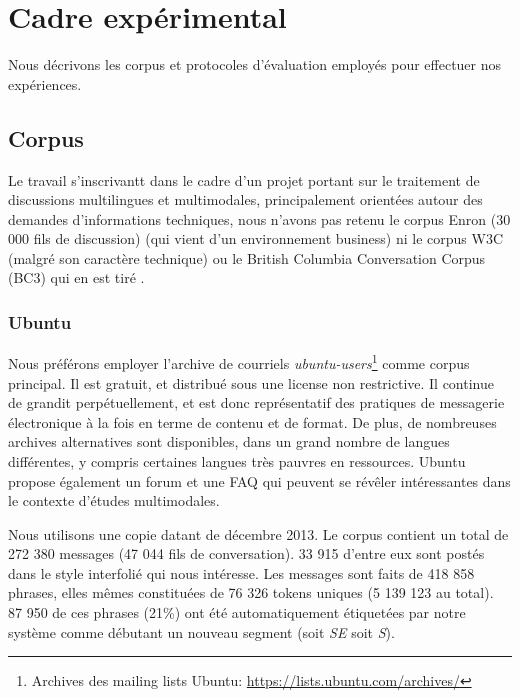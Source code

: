
\chapter{Cadre expérimental}

\label{ch:experimental_framework}

Nous décrivons les corpus et protocoles d'évaluation employés pour effectuer nos expériences.

\section{Corpus}

Le travail s'inscrivantt dans le cadre d'un projet portant sur le traitement de discussions multilingues et multimodales, principalement orientées autour des demandes d'informations techniques, nous n'avons pas retenu le corpus Enron (30 000 fils de discussion) \cite{klimt:2004:enron} (qui vient d'un environnement business) ni le corpus W3C (malgré son caractère technique) ou le British Columbia Conversation Corpus (BC3) qui en est tiré \cite{ulrich:2008:bc3}.

\subsection{Ubuntu}

Nous préférons employer l'archive de courriels \textit{ubuntu-users}\footnote{Archives des mailing lists Ubuntu: \url{https://lists.ubuntu.com/archives/}} comme corpus principal. Il est gratuit, et distribué sous une license non restrictive. Il continue de grandit perpétuellement, et est donc représentatif des pratiques de messagerie électronique à la fois en terme de contenu et de format. De plus, de nombreuses archives alternatives sont disponibles, dans un grand nombre de langues différentes, y compris certaines langues très pauvres en ressources. Ubuntu propose également un forum et une FAQ qui peuvent se révêler intéressantes dans le contexte d'études multimodales.

Nous utilisons une copie datant de décembre 2013. Le corpus contient un total de 272 380 messages (47 044 fils de conversation). 33 915 d'entre eux sont postés dans le style interfolié qui nous intéresse. Les messages sont faits de 418 858 phrases, elles mêmes constituées de 76 326 tokens uniques (5 139 123 au total). 87 950 de ces phrases (21\%) ont été automatiquement étiquetées par notre système comme débutant un nouveau segment (soit \textit{SE} soit \textit{S}).

